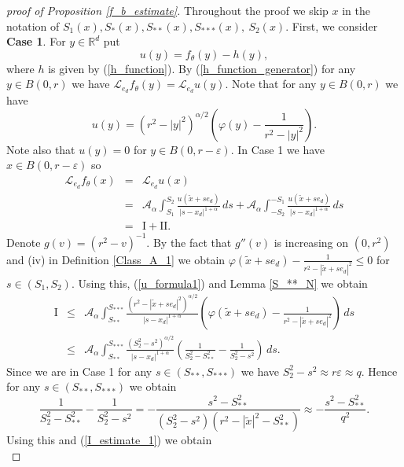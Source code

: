 \documentclass[a4paper,12pt,reqno]{amsart}
\theoremstyle{definition}
\theoremstyle{remark}
\newcommand{\eps}{\varepsilon}
\newcommand{\calA}{\mathcal{A}}
\newcommand{\calL}{\mathcal{L}}
\newcommand{\R}{\mathds{R}}
\begin{document}
\begin{proof}[proof of Proposition \ref{f_b_estimate}]
Throughout the proof we skip $x$ in the notation of $S_1(x),  S_{*}(x), S_{**}(x), S_{***}(x), \ S_2(x)$. 
\vskip 2pt
First, we consider {\bf Case 1}.
%
%
 For $y \in \R^d$ put
$$
u(y) = f_{\theta}(y) -  h(y),
$$
where $h$ is given by (\ref{h_function}).
 By (\ref{h_function_generator}) for any $y \in B(0,r)$ we have $\calL_{e_d} f_{\theta}(y) = \calL_{e_d} u(y)$.
 Note that for any $y \in B(0,r)$ we have
\begin{equation}
\label{u_formula1}
u(y) =  (r^2 - |y|^2)^{\alpha/2} \left(\varphi(y) - \frac{1}{r^2 - |y|^2}\right).
\end{equation} 
 Note also that $u(y) = 0$ for $y \in B(0,r - \eps)$. In Case 1 we have $x \in B(0,r - \eps)$ so
\begin{eqnarray*}
\calL_{e_d} f_{\theta}(x) &=& \calL_{e_d} u(x)\\
&=& \calA_{\alpha} \int_{S_1}^{S_2} \frac{u(\tilde{x} +s e_d)}{|s - x_d|^{1+\alpha}} \, ds
+   \calA_{\alpha} \int_{-S_2}^{-S_1} \frac{u(\tilde{x} +s e_d)}{|s - x_d|^{1+\alpha}}  \, ds\\
&=& \text{I} + \text{II}.
\end{eqnarray*}
Denote $g(v) = (r^2 - v)^{-1}$. By the fact that $g''(v)$ is increasing on $(0,r^2)$ and (iv) in Definition \ref{Class_A_1}  we obtain  $\varphi(\tilde{x} + s e_d) - \frac{1}{r^2 - |\tilde{x} + s e_d|^2} \le 0$ for $s \in (S_1, S_2)$. Using this, (\ref{u_formula1}) and Lemma \ref{S_**_N} we obtain 
\begin{eqnarray}
\nonumber
\text{I}
&\le& \calA_{\alpha} \int_{S_{**}}^{S_{***}} 
\frac{(r^2 - |\tilde{x} + s e_d|^2)^{\alpha/2}}{|s - x_d|^{1+\alpha} }
\left(\varphi(\tilde{x} + s e_d) - \frac{1}{r^2 - |\tilde{x} + s e_d|^2}\right) \, ds\\
\label{I_estimate_1}
&\le& \calA_{\alpha} \int_{S_{**}}^{S_{***}} 
\frac{ (S_2^2 - s^2)^{\alpha/2}}{|s - x_d|^{1+\alpha} }
\left(\frac{1}{S_2^2 - S_{**}^2} - \frac{1}{S_2^2 - s^2}\right) \, ds. 
\end{eqnarray}
 Since we are in Case 1 for any $s \in (S_{**}, S_{***})$ we have $S_2^2 - s^2 \approx r \eps\approx q$. Hence for any 
$s \in (S_{**}, S_{***})$ we obtain
\begin{equation*}
\frac{1}{S_2^2 - S_{**}^2} - \frac{1}{S_2^2 - s^2 }
= -\frac{s^2 - S_{**}^2}{(S_2^2 - s^2)(r^2 - |\tilde{x}|^2 - S_{**}^2)}
\approx -\frac{s^2 - S_{**}^2}{q^2}.
\end{equation*}
Using this and (\ref{I_estimate_1}) we obtain
\begin{equation}
\label{I_estimate_2}

\end{equation}
\end{proof}
\end{document}
